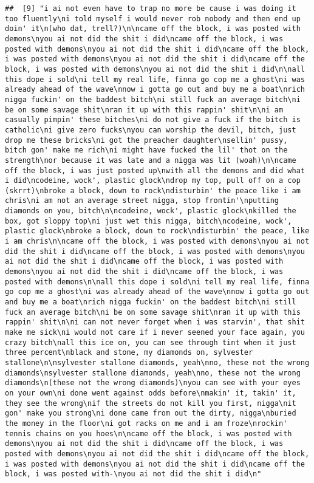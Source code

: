 \documentclass[]{article}
\begin{document}
\begin{verbatim}
##  [9] "i ai not even have to trap no more be cause i was doing it too fluently\ni told myself i would never rob nobody and then end up doin' it\n(who dat, trell?)\n\ncame off the block, i was posted with demons\nyou ai not did the shit i did\ncame off the block, i was posted with demons\nyou ai not did the shit i did\ncame off the block, i was posted with demons\nyou ai not did the shit i did\ncame off the block, i was posted with demons\nyou ai not did the shit i did\n\nall this dope i sold\ni tell my real life, finna go cop me a ghost\ni was already ahead of the wave\nnow i gotta go out and buy me a boat\nrich nigga fuckin' on the baddest bitch\ni still fuck an average bitch\ni be on some savage shit\nran it up with this rappin' shit\n\ni am casually pimpin' these bitches\ni do not give a fuck if the bitch is catholic\ni give zero fucks\nyou can worship the devil, bitch, just drop me these bricks\ni got the preacher daughter\nsellin' pussy, bitch gon' make me rich\ni might have fucked the lil' thot on the strength\nor because it was late and a nigga was lit (woah)\n\ncame off the block, i was just posted up\nwith all the demons and did what i did\ncodeine, wock', plastic glock\ndrop my top, pull off on a cop (skrrt)\nbroke a block, down to rock\ndisturbin' the peace like i am chris\ni am not an average street nigga, stop frontin'\nputting diamonds on you, bitch\n\ncodeine, wock', plastic glock\nkilled the box, got sloppy top\ni just wet this nigga, bitch\ncodeine, wock', plastic glock\nbroke a block, down to rock\ndisturbin' the peace, like i am chris\n\ncame off the block, i was posted with demons\nyou ai not did the shit i did\ncame off the block, i was posted with demons\nyou ai not did the shit i did\ncame off the block, i was posted with demons\nyou ai not did the shit i did\ncame off the block, i was posted with demons\n\nall this dope i sold\ni tell my real life, finna go cop me a ghost\ni was already ahead of the wave\nnow i gotta go out and buy me a boat\nrich nigga fuckin' on the baddest bitch\ni still fuck an average bitch\ni be on some savage shit\nran it up with this rappin' shit\n\ni can not never forget when i was starvin', that shit make me sick\ni would not care if i never seened your face again, you crazy bitch\nall this ice on, you can see through tint when it just three percent\nblack and stone, my diamonds on, sylvester stallone\n\nsylvester stallone diamonds, yeah\nno, these not the wrong diamonds\nsylvester stallone diamonds, yeah\nno, these not the wrong diamonds\n(these not the wrong diamonds)\nyou can see with your eyes on your own\ni done went against odds before\nmakin' it, takin' it, they see the wrong\nif the streets do not kill you first, nigga\nit gon' make you strong\ni done came from out the dirty, nigga\nburied the money in the floor\ni got racks on me and i am froze\nrockin' tennis chains on you hoes\n\ncame off the block, i was posted with demons\nyou ai not did the shit i did\ncame off the block, i was posted with demons\nyou ai not did the shit i did\ncame off the block, i was posted with demons\nyou ai not did the shit i did\ncame off the block, i was posted with-\nyou ai not did the shit i did\n"                                                                                                                         
\end{verbatim}
\end{document}
